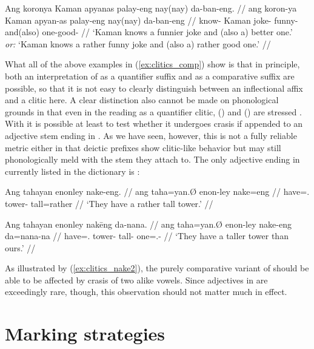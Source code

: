 \a\label{ex:clitics_comp3}\begingl
	\gla Ang koronya Kaman apyanas palay-eng nay(nay) da-ban-eng. //
	\glb ang koron-ya Kaman apyan-as palay-eng nay(nay) da-ban-eng //
	\glc \AgtT{} know-\TsgM{} Kaman joke-\Parg{} funny-\Comp{} 
		and(\til{}also) one-good-\Comp{} //
	\glft `Kaman knows a funnier joke and (also a) better one.' \\
		\textit{or:} `Kaman knows a rather funny joke and (also a) rather good 
		one.' //
\endgl
\xe

What all of the above examples in (\ref{ex:clitics_comp}) show is that in
principle, both an interpretation of  as a quantifier suffix
and as a comparative suffix are possible, so that it is not easy to clearly
distinguish between an inflectional affix and a clitic here. A clear
distinction also cannot be made on phonological grounds in that even in the
reading as a quantifier clitic,  (\Comp{}) and
 (\Supl{}) are stressed 
\parencite[compare][90--92]{spencerluis2012}. With  it is
possible at least to test whether it undergoes crasis if appended to an
adjective stem ending in . As we have seen, however, this is not a
fully reliable metric either in that deictic prefixes show clitic-like behavior
but may still phonologically meld with the stem they attach to. The only
adjective ending in  currently listed in the dictionary is 
:

\pex\label{ex:clitics_nake}
\a\label{ex:clitics_nake1}\begingl
	\gla Ang tahayan enonley nake-eng. //
	\glb ang taha=yan.Ø enon-ley nake=eng //
	\glc \Aarg{} have=\TplM{}.\Top{} tower-\PargI{} tall=rather //
	\glft `They have a rather tall tower.' //
\endgl

\a\label{ex:clitics_nake2}\begingl
	\gla Ang tahayan enonley nakēng da-nana. //
	\glb ang taha=yan.Ø enon-ley nake-eng da=nana-na //
	\glc \Aarg{} have=\TplM{}.\Top{} tower-\PargI{} tall-\Comp{}
		one=\Fpl{}.\Gen{}-\Gen{} //
	\glft `They have a taller tower than ours.' //
\endgl
\xe

As illustrated by (\ref{ex:clitics_nake2}), the purely comparative variant of
 should be able to be affected by crasis of two alike vowels.
Since adjectives in  are exceedingly rare, though, this
observation should not matter much in effect.


\section{Marking strategies}
\label{sec:markstrat}

